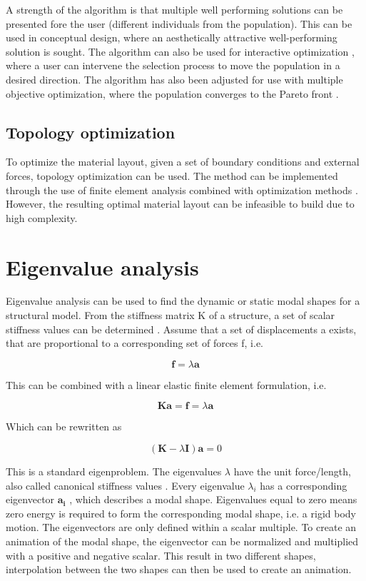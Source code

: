 A strength of the algorithm is that multiple well performing solutions can be presented fore the user (different individuals from the population). This can be used in conceptual design, where an aesthetically attractive well-performing solution is sought. The algorithm can also be used for interactive optimization \cite{Scott2002}, where a user can intervene the selection process to move the population in a desired direction. The algorithm has also been adjusted for use with multiple objective optimization, where the population converges to the Pareto front \cite{deb2002fast}.

\subsection{Topology optimization}
To optimize the material layout, given a set of boundary conditions and external forces, topology optimization can be used. The method can be implemented through the use of finite element analysis combined with optimization methods \cite{bendsoe2009topology}. However, the resulting optimal material layout can be infeasible to build due to high complexity.

\section{Eigenvalue analysis}
Eigenvalue analysis can be used to find the dynamic or static modal shapes for a structural model. From the stiffness matrix K of a structure, a set of scalar stiffness values can be determined \cite{Olsson2003}. Assume that a set of displacements a exists, that are proportional to a corresponding set of forces f, i.e.

\begin{equation*}
\mathbf{f} = \lambda \mathbf{a}
\end{equation*}

This can be combined with a linear elastic finite element formulation, i.e.

\begin{equation*}
\mathbf{Ka} =\mathbf{f} = \lambda \mathbf{a}
\end{equation*}

Which can be rewritten as

\begin{equation*}
(\mathbf{K} - \lambda \mathbf{I})\mathbf{a} = 0
\end{equation*}

This is a standard eigenproblem. The eigenvalues   $\lambda$ have the unit force/length, also called canonical stiffness values \cite{Olsson2006}. Every eigenvalue  $\lambda_i$ has a corresponding eigenvector   $\mathbf{a_i}$ , which describes a modal shape. Eigenvalues equal to zero means zero energy is required to form the corresponding modal shape, i.e. a rigid body motion. The eigenvectors are only defined within a scalar multiple. To create an animation of the modal shape, the eigenvector can be normalized and multiplied with a positive and negative scalar. This result in two different shapes, interpolation between the two shapes can then be used to create an animation.


